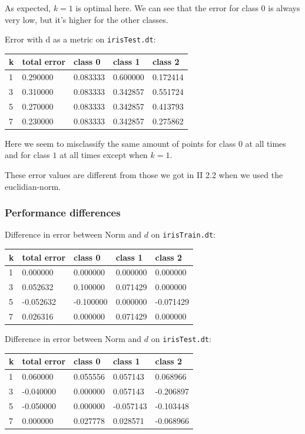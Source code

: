 \documentclass[a4paper,10pt]{article}
\begin{document}
As expected, $k=1$ is optimal here. We can see that the error for class $0$ is always very low, but it's higher for the other classes.

Error with d as a metric on \verb=irisTest.dt=:
\begin{center}
\begin{tabular}{l|llll}
 k & total error & class 0 & class 1 & class 2\\ \hline
 1 & 0.290000 & 0.083333 & 0.600000 & 0.172414\\
 3 & 0.310000 & 0.083333 & 0.342857 & 0.551724\\
 5 & 0.270000 & 0.083333 & 0.342857 & 0.413793\\
 7 & 0.230000 & 0.083333 & 0.342857 & 0.275862\\
\end{tabular}
\end{center}

Here we seem to misclassify the same amount of points for class $0$ at all times and for class $1$ at all times except when $k=1$.

These error values are different from those we got in II 2.2 when we
used the euclidian-norm.

\subsubsection*{Performance differences}
Difference in error between Norm and $d$ on \verb=irisTrain.dt=:\\
\begin{center}
\begin{tabular}{l|llll}
 k & total error & class 0 & class 1 & class 2\\ \hline
 1 & 0.000000 & 0.000000 & 0.000000 & 0.000000 \\
 3 & 0.052632 & 0.100000 & 0.071429 & 0.000000 \\
 5 & -0.052632 & -0.100000 & 0.000000 & -0.071429 \\
 7 & 0.026316 & 0.000000 & 0.071429 & 0.000000 \\
\end{tabular}
\end{center}

Difference in error between Norm and $d$ on \verb=irisTest.dt=:\\
\begin{center}
\begin{tabular}{l|llll}
 k & total error & class 0 & class 1 & class 2\\ \hline
 1 & 0.060000 & 0.055556 & 0.057143 & 0.068966 \\
 3 & -0.040000 & 0.000000 & 0.057143 & -0.206897 \\
 5 & -0.050000 & 0.000000 & -0.057143 & -0.103448 \\
 7 & 0.000000 & 0.027778 & 0.028571 & -0.068966 \\
\end{tabular}
\end{center}
\end{document}
